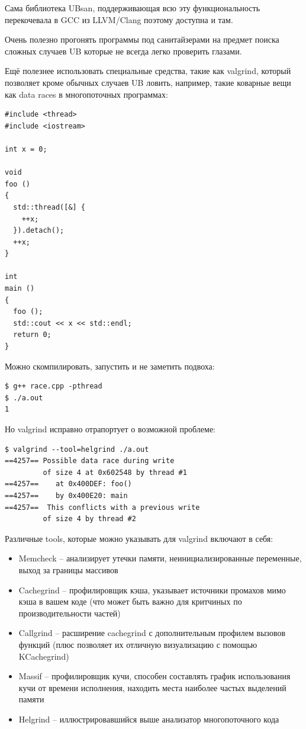 \documentclass[a4paper,12pt,oneside]{article}
\begin{document}
Сама библиотека UBsan, поддерживающая всю эту функциональность перекочевала в GCC из LLVM/Clang поэтому доступна и там.

Очень полезно прогонять программы под санитайзерами на предмет поиска сложных случаев UB которые не всегда легко проверить глазами.

Ещё полезнее использовать специальные средства, такие как valgrind, который позволяет кроме обычных случаев UB ловить, например, такие коварные вещи как data races в многопоточных программах:

\begin{lstlisting}
#include <thread>
#include <iostream>

int x = 0;

void
foo ()
{
  std::thread([&] {
    ++x;
  }).detach();
  ++x;
}

int
main ()
{
  foo ();
  std::cout << x << std::endl;
  return 0;
}
\end{lstlisting}

Можно скомпилировать, запустить и не заметить подвоха:

\begin{verbatim}
$ g++ race.cpp -pthread
$ ./a.out
1
\end{verbatim}

Но valgrind исправно отрапортует о возможной проблеме:

\begin{verbatim}
$ valgrind --tool=helgrind ./a.out
==4257== Possible data race during write 
         of size 4 at 0x602548 by thread #1
==4257==    at 0x400DEF: foo() 
==4257==    by 0x400E20: main 
==4257==  This conflicts with a previous write 
         of size 4 by thread #2
\end{verbatim}

Различные tools, которые можно указывать для valgrind включают в себя:

\begin{itemize}
\item Memcheck -- анализирует утечки памяти, неинициализированные переменные, выход за границы массивов
\item Cachegrind -- профилировщик кэша, указывает источники промахов мимо кэша в вашем коде (что может быть важно для критчиных по производительности частей)
\item Callgrind -- расширение cachegrind с дополнительным профилем вызовов функций (плюс позволяет их отличную визуализацию с помощью KCachegrind)
\item Massif -- профилировщик кучи, способен составлять график использования кучи от времени исполнения, находить места наиболее частых выделений памяти
\item Helgrind -- иллюстрировавшийся выше анализатор многопоточного кода
\end{itemize}
\end{document}
